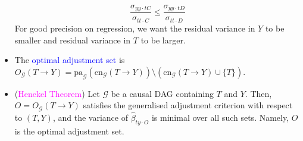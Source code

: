 \documentclass[UTF8]{book}
\newcommand{\concept}[1]{\textcolor{magenta}{#1}}
\renewcommand{\emph}[1]{\textcolor{blue}{#1}}
\begin{document}
\begin{itemize}
$$
	\dfrac{\sigma_{yy\cdot tC}}{\sigma_{tt\cdot C}}\leq\dfrac{\sigma_{yy\cdot tD}}{\sigma_{tt\cdot D}}
$$
For good precision on regression, we want the residual variance in $Y$ to be smaller and residual variance in $T$ to be larger.
\item The \emph{optimal adjustment set} is $O_\mathcal{G}(T\rightarrow Y) = \mathrm{pa}_\mathcal{G}(\mathrm{cn}_\mathcal{G}(T\rightarrow Y))\setminus (\mathrm{cn}_\mathcal{G}(T\rightarrow Y)\cup \{T\})$.
\item (\concept{Henekel Theorem}) Let $\mathcal{G}$ be a causal DAG containing $T$ and $Y$. Then, $O = O_\mathcal{G}(T\rightarrow Y)$ satisfies the generalised adjustment criterion with respect to $(T,Y)$, and the variance of $\hat{\beta}_{ty\cdot O}$ is minimal over all such sets. Namely, $O$ is the optimal adjustment set.
\end{itemize}
\end{document}
